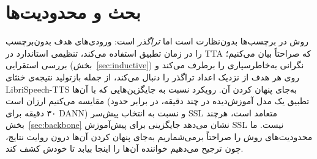 \documentclass[a4paper,11pt]{article}
\begin{document}
\section{بحث و محدودیت‌ها}
روش در برچسب‌ها بدون‌نظارت است اما \emph{تراگذر} است: ورودی‌های هدف
بدون‌برچسب را در زمان تطبیق استفاده می‌کند، تنظیمی استاندارد در TTA که
صراحتاً بیان می‌کنیم؛ بررسی استقرایی (بخش~\ref{sec:inductive}) نگرانی
به‌خاطرسپاری را برطرف می‌کند و روی هر هدف از نزدیک اعداد تراگذر را دنبال
می‌کند، از جمله بازتولید نتیجه‌ی خنثای LibriSpeech-TTS به‌جای پنهان کردن
آن. رویکرد نسبت به جایگزین‌هایی که با آن‌ها مقایسه می‌کنیم ارزان است (تطبیق
یک مدل آموزش‌دیده در چند دقیقه، در برابر حدود ۳۰ دقیقه برای DANN) و نسبت
به انتخاب پیش‌سر SSL متعامد است، هرچند بخش~\ref{sec:backbone} نشان می‌دهد
جایگزینی برای پیش‌آموزش SSL نیست. ما محدودیت‌های روش را صراحتاً برمی‌شماریم
به‌جای پنهان کردن آن‌ها درون روایت نتایج، چون ترجیح می‌دهیم خواننده آن‌ها را
اینجا بیابد تا خودش کشف کند.
\end{document}

